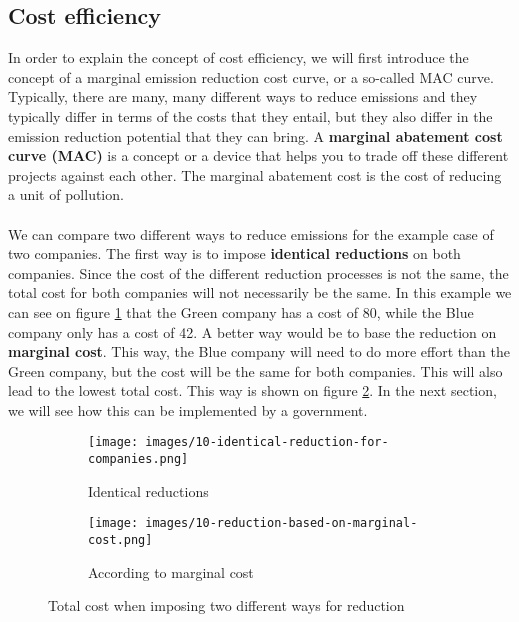 \documentclass[../summary.tex]{subfiles}
\begin{document}
	\subsection{Cost efficiency}
	In order to explain the concept of cost efficiency, we will first introduce the concept of a marginal emission reduction cost curve, or a so-called MAC curve. Typically, there are many, many different ways to reduce emissions and they typically differ in terms of the costs that they entail, but they also differ in the emission reduction potential that they can bring. A \textbf{marginal abatement cost curve (MAC)} is a concept or a device that helps you to trade off these different projects against each other. The marginal abatement cost is the cost of reducing a unit of pollution.
	\\\\
	We can compare two different ways to reduce emissions for the example case of two companies. The first way is to impose \textbf{identical reductions} on both companies. Since the cost of the different reduction processes is not the same, the total cost for both companies will not necessarily be the same. In this example we can see on figure \ref{fig:reduction-identical} that the Green company has a cost of 80, while the Blue company only has a cost of 42. A better way would be to base the reduction on \textbf{marginal cost}. This way, the Blue company will need to do more effort than the Green company, but the cost will be the same for both companies. This will also lead to the lowest total cost. This way is shown on figure \ref{fig:reduction-marginal-cost}. In the next section, we will see how this can be implemented by a government.
	
	\begin{figure}[htbp]
		\centering
		\begin{subfigure}{.5\textwidth}
			\centering
			\texttt{[image: images/10-identical-reduction-for-companies.png]}
			\caption{Identical reductions}
			\label{fig:reduction-identical}
		\end{subfigure}%
		\begin{subfigure}{.5\textwidth}
			\centering
			\texttt{[image: images/10-reduction-based-on-marginal-cost.png]}
			\caption{According to marginal cost}
			\label{fig:reduction-marginal-cost}
		\end{subfigure}
		\caption{Total cost when imposing two different ways for reduction}
		\label{fig:reduction}
	\end{figure}
	\newpage
\end{document}
